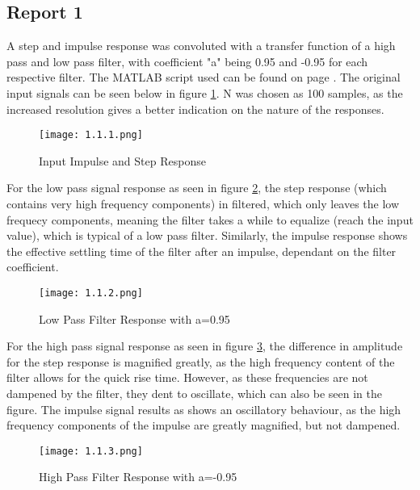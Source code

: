 \subsection*{Report 1}

	A step and impulse response was convoluted with a transfer function of a high pass and low pass filter, with coefficient "a" being 0.95 and -0.95 for each respective filter. The MATLAB script used can be found on page \pageref{matlab_1.1}. The original input signals can be seen below in figure \ref{figure:1_1_1}. N was chosen as 100 samples, as the increased resolution gives a better indication on the nature of the responses.
	
	\begin{figure}[H] 
		\centering
		\texttt{[image: 1.1.1.png]}
		\caption{Input Impulse and Step Response}
		\label{figure:1_1_1}
	\end{figure}
	
	For the low pass signal response as seen in figure \ref{figure:1_1_2}, the step response (which contains very high frequency components) in filtered, which only leaves the low frequecy components, meaning the filter takes a while to equalize (reach the input value), which is typical of a low pass filter. Similarly, the impulse response shows the effective settling time of the filter after an impulse, dependant on the filter coefficient.
	
	\begin{figure}[H] 
		\centering
		\texttt{[image: 1.1.2.png]}
		\caption{Low Pass Filter Response with a=0.95}
		\label{figure:1_1_2}
	\end{figure}

	For the high pass signal response as seen in figure \ref{figure:1_1_3}, the difference in amplitude for the step response is magnified greatly, as the high frequency content of the filter allows for the quick rise time. However, as these frequencies are not dampened by the filter, they dent to oscillate, which can also be seen in the figure. The impulse signal results as shows an oscillatory behaviour, as the high frequency components of the impulse are greatly magnified, but not dampened.
	
	\begin{figure}[H] 
		\centering
		\texttt{[image: 1.1.3.png]}
		\caption{High Pass Filter Response with a=-0.95}
		\label{figure:1_1_3}
	\end{figure}